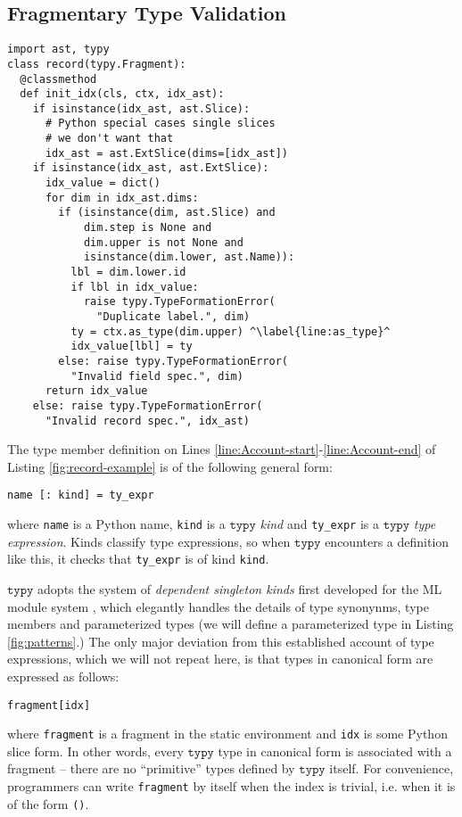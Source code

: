 \documentclass[preprint,10pt]{sigplanconf}
\newcommand{\typy}{\texttt{typy}}
\newcommand{\lip}[1]{\lstinline[language=Python,basicstyle=\ttfamily\footnotesize,deletendkeywords={tuple,buffer,map}]{#1}}
\begin{document}
\vspace{-4px}\subsection{Fragmentary Type Validation}\label{sec:types}\vspace{-3px}
\begin{codelisting}[t]
\vspace{-3px}
\begin{lstlisting}
import ast, typy
class record(typy.Fragment):
  @classmethod
  def init_idx(cls, ctx, idx_ast):
    if isinstance(idx_ast, ast.Slice):
      # Python special cases single slices
      # we don't want that
      idx_ast = ast.ExtSlice(dims=[idx_ast])
    if isinstance(idx_ast, ast.ExtSlice):
      idx_value = dict()
      for dim in idx_ast.dims:
        if (isinstance(dim, ast.Slice) and 
            dim.step is None and 
            dim.upper is not None and 
            isinstance(dim.lower, ast.Name)):
          lbl = dim.lower.id
          if lbl in idx_value:
            raise typy.TypeFormationError(
              "Duplicate label.", dim)
          ty = ctx.as_type(dim.upper) ^\label{line:as_type}^
          idx_value[lbl] = ty
        else: raise typy.TypeFormationError(
          "Invalid field spec.", dim)
      return idx_value
    else: raise typy.TypeFormationError(
      "Invalid record spec.", idx_ast)
\end{lstlisting}
\caption{Record type validation.}
\label{fig:type-validation}
\end{codelisting}

The type member definition on Lines \ref{line:Account-start}-\ref{line:Account-end} of Listing \ref{fig:record-example} is of the following general form:
\begin{lstlisting}[numbers=none]
name [: kind] = ty_expr
\end{lstlisting}
where \lip{name} is a Python name, \lip{kind} is a $\typy$ \emph{kind} and \lip{ty_expr} is a $\typy$ \emph{type expression}. Kinds classify type expressions, so when $\typy$ encounters a definition like this, it checks that \lip{ty_expr} is of kind \lip{kind}. 

$\typy$ adopts the system of \emph{dependent singleton kinds} first developed for the ML module system \cite{DBLP:conf/lfmtp/Crary09,pfpl}, which elegantly handles the details of type synonynms, type members and parameterized types (we will define a parameterized type in Listing \ref{fig:patterns}.) The only major deviation from this established account of type expressions, which we will not repeat here, is that types in canonical form are  expressed as follows:
\begin{lstlisting}[numbers=none]
fragment[idx]
\end{lstlisting}
where \lip{fragment} is a fragment in the static environment and \lip{idx} is some Python slice form. In other words, every $\typy$ type in canonical form is associated with a fragment -- there are no ``primitive'' types defined by $\typy$ itself. For convenience, programmers can write \lip{fragment} by itself when the index is trivial, i.e. when it is of the form \lip{()}. 
\end{document}
